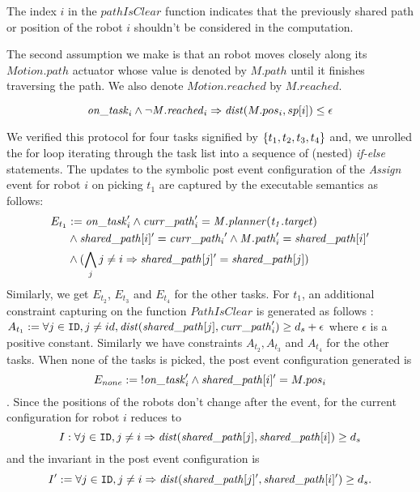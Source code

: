  The index $i$ in the $\mathit{pathIsClear}$ function indicates that the previously shared path or position of the robot $i$ shouldn't be considered in the computation.

The second assumption we make is that an robot moves closely along its $\mathit{Motion.path}$ actuator whose value is denoted by $\mathit{M.path}$ until it finishes traversing the path. We also denote $\mathit{Motion.reached}$ by $\mathit{M.reached}$.
\begin{assumption}
        \label{stlinemotion}
    $$\mathit{on\_task}_i\wedge \neg \mathit{M.reached}_i \Rightarrow \mathit{dist}(M.pos_i, sp[i]) \leq \epsilon $$
\end{assumption}

We verified this protocol for four tasks signified by $\left\{t_1,t_2,t_3,t_4\right\}$ and, we unrolled the for loop iterating through the task list into a sequence of (nested) \emph{if-else} statements. The updates to the symbolic post event configuration of the \emph{Assign} event for robot $i$ on picking $t_1$ are captured by the \K executable semantics as follows: \begin{align*}E_{t_1} &:= \mathit{on\_task}_i' \wedge \mathit{curr\_path}_i' = \mathit{M.planner(t_1.target)} \\ &\wedge \mathit{shared\_path}[i]' = \mathit{curr\_path_i}' \wedge \mathit{M.path}_i' = \mathit{shared\_path}[i]' \\
  &\wedge (\bigwedge_j j\neq i \Rightarrow \mathit{shared\_path}[j]'= \mathit{shared\_path}[j] )
 \end{align*}
Similarly, we get $E_{t_2}$, $E_{t_3}$ and $E_{t_4}$ for the other tasks. For $t_1$, an additional constraint capturing  on the function $\mathit{PathIsClear}$ is generated as follows :  $A_{t_1} := \forall j \in \texttt{ID}, j \neq id, \mathit{dist}(\mathit{shared\_path}[j], \mathit{curr\_path}_i') \geq d_s + \epsilon$ where $\epsilon$ is a positive constant. Similarly we have constraints $A_{t_2}, A_{t_3}$  and $A_{t_4}$ for the other tasks. When none of the tasks is picked, the post event configuration generated is $$ E_{none} :=\mbox{!}\mathit{on\_task}_i' \wedge \mathit{shared\_path}[i]' = M.pos_i $$. Since the positions of the robots don't change after the event,  for the current configuration for robot $i$ reduces to $$I: \forall j \in \texttt{ID}, j \neq i \Rightarrow \mathit{dist}(\mathit{shared\_path}[j], \mathit{shared\_path}[i]) \geq d_s  $$ and the invariant in the post event configuration is $$I' := \forall j \in \texttt{ID}, j \neq i \Rightarrow \mathit{dist}(\mathit{shared\_path}[j]', \mathit{shared\_path}[i]') \geq d_s  .$$

